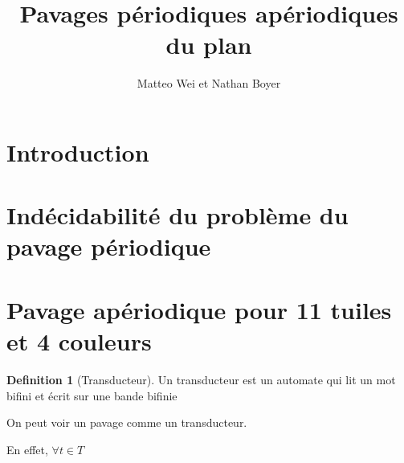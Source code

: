 \documentclass{scrartcl}
\title{Pavages périodiques apériodiques du plan}
\author{Matteo Wei et Nathan Boyer}
\theoremstyle{definition}
\newtheorem{definition}{Definition}[section]
\begin{document}
\maketitle

\section{Introduction}

\section{Indécidabilité du problème du pavage périodique}

\section{Pavage apériodique pour 11 tuiles et 4 couleurs}

\begin{definition}[Transducteur]
    
Un transducteur est un automate qui lit un mot bifini et écrit sur une bande bifinie

\end{definition}

On peut voir un pavage comme un transducteur.

En effet, $\forall t \in T$
\end{document}
